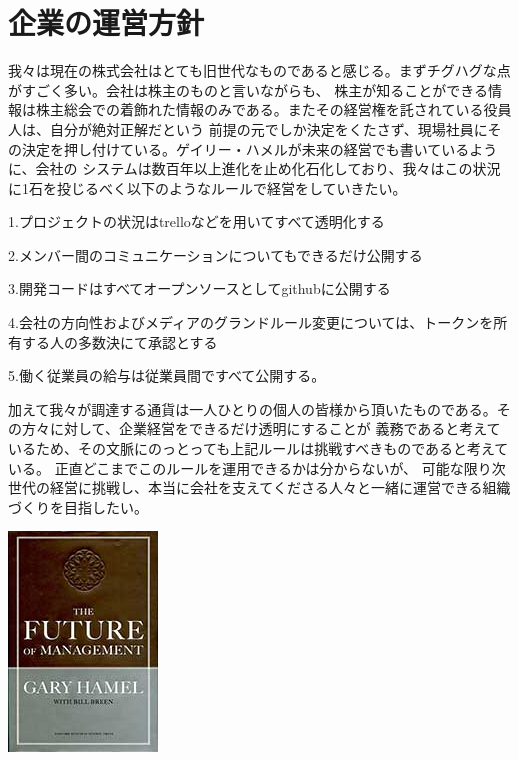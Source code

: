 \documentclass{jsarticle}
\begin{document}
\section{企業の運営方針}
我々は現在の株式会社はとても旧世代なものであると感じる。まずチグハグな点がすごく多い。会社は株主のものと言いながらも、
株主が知ることができる情報は株主総会での着飾れた情報のみである。またその経営権を託されている役員人は、自分が絶対正解だという
前提の元でしか決定をくたさず、現場社員にその決定を押し付けている。ゲイリー・ハメルが未来の経営でも書いているように、会社の
システムは数百年以上進化を止め化石化しており、我々はこの状況に1石を投じるべく以下のようなルールで経営をしていきたい。

1.プロジェクトの状況はtrelloなどを用いてすべて透明化する

2.メンバー間のコミュニケーションについてもできるだけ公開する

3.開発コードはすべてオープンソースとしてgithubに公開する

4.会社の方向性およびメディアのグランドルール変更については、トークンを所有する人の多数決にて承認とする

5.働く従業員の給与は従業員間ですべて公開する。 

加えて我々が調達する通貨は一人ひとりの個人の皆様から頂いたものである。その方々に対して、企業経営をできるだけ透明にすることが
義務であると考えているため、その文脈にのっとっても上記ルールは挑戦すべきものであると考えている。
正直どこまでこのルールを運用できるかは分からないが、
可能な限り次世代の経営に挑戦し、本当に会社を支えてくださる人々と一緒に運営できる組織づくりを目指したい。

	\includegraphics[scale=0.4]{img/thefutureofmanagement.jpg}
\end{document}
